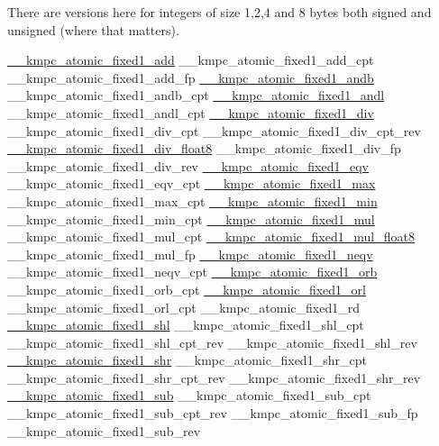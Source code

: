 There are versions here for integers of size 1,2,4 and 8 bytes both signed and unsigned (where that matters). 
\begin{DoxyCode}
\hyperlink{kmp__atomic_8h_a95740b35a6142a3795821e04a3203037}{\_\_kmpc\_atomic\_fixed1\_add}
\_\_kmpc\_atomic\_fixed1\_add\_cpt
\_\_kmpc\_atomic\_fixed1\_add\_fp
\hyperlink{kmp__atomic_8h_a8a3946fc7bd2e3e0f8cc6564f61dea6e}{\_\_kmpc\_atomic\_fixed1\_andb}
\_\_kmpc\_atomic\_fixed1\_andb\_cpt
\hyperlink{kmp__atomic_8h_af5a5916109cdfb27a59e26f211c94910}{\_\_kmpc\_atomic\_fixed1\_andl}
\_\_kmpc\_atomic\_fixed1\_andl\_cpt
\hyperlink{kmp__atomic_8h_ae0cae3c153642500cd7778b9b9cef0c1}{\_\_kmpc\_atomic\_fixed1\_div}
\_\_kmpc\_atomic\_fixed1\_div\_cpt
\_\_kmpc\_atomic\_fixed1\_div\_cpt\_rev
\hyperlink{kmp__atomic_8h_ab73acb4e17255c5ed203fdf19d1ddbce}{\_\_kmpc\_atomic\_fixed1\_div\_float8}
\_\_kmpc\_atomic\_fixed1\_div\_fp
\_\_kmpc\_atomic\_fixed1\_div\_rev
\hyperlink{kmp__atomic_8h_aba067df5aa37ab348898ef5dd6327f0c}{\_\_kmpc\_atomic\_fixed1\_eqv}
\_\_kmpc\_atomic\_fixed1\_eqv\_cpt
\hyperlink{kmp__atomic_8h_ab5cedbc082714698a47a8989ae727b63}{\_\_kmpc\_atomic\_fixed1\_max}
\_\_kmpc\_atomic\_fixed1\_max\_cpt
\hyperlink{kmp__atomic_8h_ac4dd20089ab2dda56bc8fadaee38981b}{\_\_kmpc\_atomic\_fixed1\_min}
\_\_kmpc\_atomic\_fixed1\_min\_cpt
\hyperlink{kmp__atomic_8h_a698c90f980b78656865b9f43e451ea6c}{\_\_kmpc\_atomic\_fixed1\_mul}
\_\_kmpc\_atomic\_fixed1\_mul\_cpt
\hyperlink{kmp__atomic_8h_a015565a1ba1a189ca50eca182b697359}{\_\_kmpc\_atomic\_fixed1\_mul\_float8}
\_\_kmpc\_atomic\_fixed1\_mul\_fp
\hyperlink{kmp__atomic_8h_a3a42fae93ba0eb180ea2e368154f2051}{\_\_kmpc\_atomic\_fixed1\_neqv}
\_\_kmpc\_atomic\_fixed1\_neqv\_cpt
\hyperlink{kmp__atomic_8h_a0312064bedbffd386a42e3899aec07bd}{\_\_kmpc\_atomic\_fixed1\_orb}
\_\_kmpc\_atomic\_fixed1\_orb\_cpt
\hyperlink{kmp__atomic_8h_ad636f7a8e31d520815645133e5a95101}{\_\_kmpc\_atomic\_fixed1\_orl}
\_\_kmpc\_atomic\_fixed1\_orl\_cpt
\_\_kmpc\_atomic\_fixed1\_rd
\hyperlink{kmp__atomic_8h_aaf12441595e83e82cafb1ab5b47d77f8}{\_\_kmpc\_atomic\_fixed1\_shl}
\_\_kmpc\_atomic\_fixed1\_shl\_cpt
\_\_kmpc\_atomic\_fixed1\_shl\_cpt\_rev
\_\_kmpc\_atomic\_fixed1\_shl\_rev
\hyperlink{kmp__atomic_8h_a482eeace06964d2edefcc77e1c637e7c}{\_\_kmpc\_atomic\_fixed1\_shr}
\_\_kmpc\_atomic\_fixed1\_shr\_cpt
\_\_kmpc\_atomic\_fixed1\_shr\_cpt\_rev
\_\_kmpc\_atomic\_fixed1\_shr\_rev
\hyperlink{kmp__atomic_8h_ac55f0017cd1948e589d5079aa31747fb}{\_\_kmpc\_atomic\_fixed1\_sub}
\_\_kmpc\_atomic\_fixed1\_sub\_cpt
\_\_kmpc\_atomic\_fixed1\_sub\_cpt\_rev
\_\_kmpc\_atomic\_fixed1\_sub\_fp
\_\_kmpc\_atomic\_fixed1\_sub\_rev

\end{DoxyCode}
